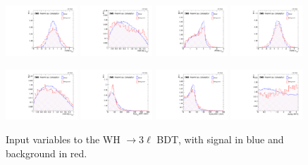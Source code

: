 \begin{figure}[!htb]
      \includegraphics[width=0.24\textwidth]{pics/VH_sec/BDT_train_WH/BDT_lep_muSS_dEta.pdf}
      \includegraphics[width=0.24\textwidth]{pics/VH_sec/BDT_train_WH/BDT_lep_muSS_cosThStar.pdf}
      \includegraphics[width=0.24\textwidth]{pics/VH_sec/BDT_train_WH/BDT_lep_muOS_dR.pdf}
      \includegraphics[width=0.24\textwidth]{pics/VH_sec/BDT_train_WH/BDT_lep_muOS_dEta.pdf}
  
      \includegraphics[width=0.24\textwidth]{pics/VH_sec/BDT_train_WH/BDT_lep_muOS_cosThStar.pdf}
      \includegraphics[width=0.24\textwidth]{pics/VH_sec/BDT_train_WH/BDT_muSS_MHT_MT.pdf}
      \includegraphics[width=0.24\textwidth]{pics/VH_sec/BDT_train_WH/BDT_lep_MHT_MT.pdf}
      \includegraphics[width=0.24\textwidth]{pics/VH_sec/BDT_train_WH/BDT_lep_MHT_dPhi_abs.pdf}
      \caption{Input variables to the WH $\to 3\ell$ BDT, with signal in blue and background in red.}
      \label{fig:wh_bdt_vars}
  \end{figure}
  
